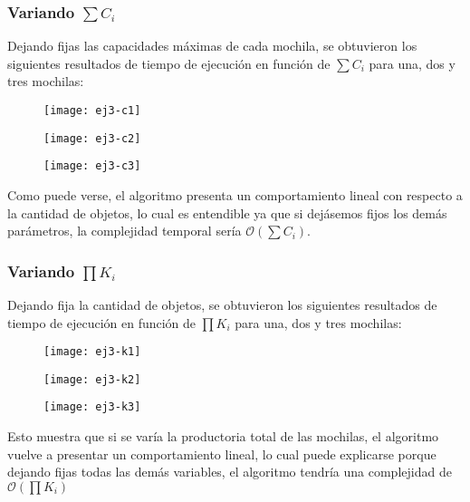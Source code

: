 \subsubsection{Variando $\sum C_i$}

Dejando fijas las capacidades máximas de cada mochila, se obtuvieron los siguientes resultados de tiempo de ejecución en función de $\sum C_i$ para una, dos y tres mochilas:

\begin{figure}[H]
		\centering
		\texttt{[image: ej3-c1]}
	\end{figure}

\begin{figure}[H]
		\centering
		\texttt{[image: ej3-c2]}
	\end{figure}

\begin{figure}[H]
		\centering
		\texttt{[image: ej3-c3]}
	\end{figure}

Como puede verse, el algoritmo presenta un comportamiento lineal con respecto a la cantidad de objetos, lo cual es entendible ya que si dejásemos fijos los demás parámetros, la complejidad temporal sería $\mathcal{O}(\sum C_i)$. %

\subsubsection{Variando $\prod K_i$}

Dejando fija la cantidad de objetos, se obtuvieron los siguientes resultados de tiempo de ejecución en función de $\prod K_i$ para una, dos y tres mochilas:

\begin{figure}[H]
		\centering
		\texttt{[image: ej3-k1]}
	\end{figure}

\begin{figure}[H]
		\centering
		\texttt{[image: ej3-k2]}
	\end{figure}

\begin{figure}[H]
		\centering
		\texttt{[image: ej3-k3]}
	\end{figure}	

Esto muestra que si se varía la productoria total de las mochilas, el algoritmo vuelve a presentar un comportamiento lineal, lo cual puede explicarse porque dejando fijas todas las demás variables, el algoritmo tendría una complejidad de $\mathcal{O}(\prod K_i)$

